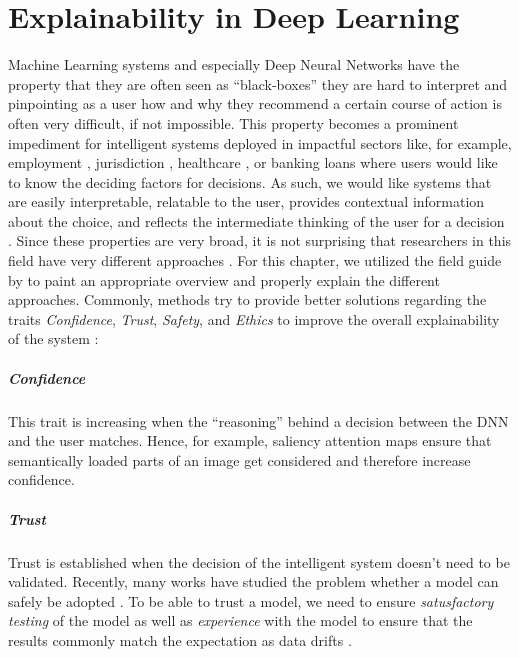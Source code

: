 \chapter{Explainability in Deep Learning} 
\label{sec:Explainability} 

Machine Learning systems and especially Deep Neural Networks have the property that they are often seen as ``black-boxes'' \ie they are hard to interpret and pinpointing as a user how and why they recommend a certain course of action is often very difficult, if not impossible. This property becomes a prominent impediment for intelligent systems deployed in impactful sectors like, for example, employment \citep{QinZXZJCX18, CaiSJLQXZ20, ZhaoHCFZ18}, jurisdiction \citep{GuoHQX019}, healthcare \citep{Pasa2019}, or banking loans where users would like to know the deciding factors for decisions. As such, we would like systems that are easily interpretable, relatable to the user, provides contextual information about the choice, and reflects the intermediate thinking of the user for a decision \citep{xie2020explainable}. Since these properties are very broad, it is not surprising that researchers in this field have very different approaches \citep{xie2020explainable}. For this chapter, we utilized the field guide by \citet{xie2020explainable} to paint an appropriate overview and properly explain the different approaches. Commonly, methods try to provide better solutions regarding the traits \emph{Confidence}, \emph{Trust}, \emph{Safety}, and \emph{Ethics} to improve the overall explainability of the system \citep{xie2020explainable}:

\paragraph{Confidence}
This trait is increasing when the ``reasoning'' behind a decision between the DNN and the user matches. Hence, for example, saliency attention maps \citep{ParkHARSDR18, HudsonM18} ensure that semantically loaded parts of an image get considered and therefore increase confidence.

\paragraph{Trust} 
Trust is established when the decision of the intelligent system doesn't need to be validated. Recently, many works have studied the problem whether a model can safely be adopted \citep{GharibLBADB18, VarshneyA17, JiangKGG18}. To be able to trust a model, we need to ensure \emph{satusfactory testing} of the model as well as \emph{experience} with the model to ensure that the results commonly match the expectation as data drifts \citep{xie2020explainable}.

